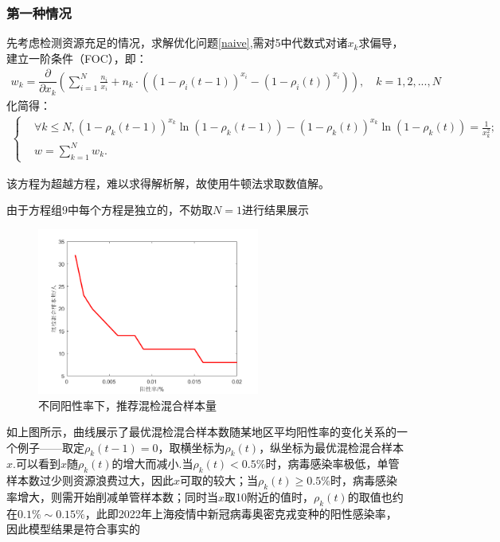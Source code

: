\documentclass[withoutpreface,bwprint]{cumcmthesis} %
\begin{document}
\subsubsection{第一种情况}
先考虑检测资源充足的情况，求解优化问题\ref{naive},需对5中代数式对诸$x_k$求偏导，建立一阶条件（FOC），即：
\begin{align*}
w_k = \dfrac{\partial}{\partial x_k} \left( \sum^N_{i=1} \frac{n_i}{x_i}+ n_k\cdot   ((1-\rho_i(t-1))^{x_i}-(1-\rho_i(t))^{x_i}) \right),\quad k=1,2,...,N
\end{align*}
化简得：
\begin{align}
\left\{
\begin{aligned}
        &\forall k \leqslant N,(1-\rho_k(t-1))^{x_k}\ln(1-\rho_k(t-1))-(1-\rho_k(t))^{x_k}\ln(1-\rho_k(t))=\frac{1}{x^2_k}; \\
    &w=\sum^N_{k=1}w_k.
\end{aligned}
\right.
\end{align}


该方程为超越方程，难以求得解析解，故使用牛顿法求取数值解。

由于方程组9中每个方程是独立的，不妨取$N=1$进行结果展示
\begin{figure}[H]
\centering
\includegraphics[width=0.65\textwidth]{fig_pro1.png}
\caption{不同阳性率下，推荐混检混合样本量}
\label{pro1}
\end{figure}

如上图所示，曲线展示了最优混检混合样本数随某地区平均阳性率的变化关系的一个例子——取定$\rho_k(t-1)=0$，取横坐标为$\rho_k(t)$，纵坐标为最优混检混合样本$x$.可以看到$x$随$\rho_k(t)$的增大而减小.当$\rho_k(t)<0.5\%$时，病毒感染率极低，单管样本数过少则资源浪费过大，因此$x$可取的较大；当$\rho_k(t) \geqslant 0.5\%$时，病毒感染率增大，则需开始削减单管样本数；同时当$x$取10附近的值时，$\rho_k(t)$的取值也约在$0.1\% \sim 0.15\%$，此即2022年上海疫情中新冠病毒奥密克戎变种的阳性感染率，因此模型结果是符合事实的
\end{document}
